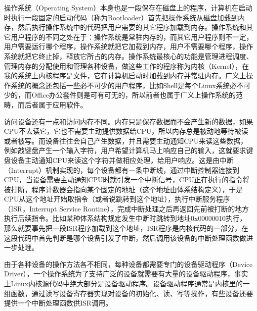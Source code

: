 操作系统（Operating System）本身也是一段保存在磁盘上的程序，计算机在启动时执行一段固定的启动代码（称为Bootloader）首先把操作系统从磁盘加载到内存，然后执行操作系统中的代码把用户需要的其它程序加载到内存。操作系统和其它用户程序的不同之处在于：操作系统是常驻内存的，而其它用户程序则不一定，用户需要运行哪个程序，操作系统就把它加载到内存，用户不需要哪个程序，操作系统就把它终止掉，释放它所占的内存。操作系统最核心的功能是管理进程调度、管理内存的分配使用和管理各种设备，做这些工作的程序称为内核（Kernel），在我的系统上内核程序是文件，它在计算机启动时加载到内存并常驻内存。广义上操作系统的概念还包括一些必不可少的用户程序，比如Shell是每个Linux系统必不可少的，而Office办公套件则是可有可无的，所以前者也属于广义上操作系统的范畴，而后者属于应用软件。



访问设备还有一点和访问内存不同。内存只是保存数据而不会产生新的数据，如果CPU不去读它，它也不需要主动提供数据给CPU，所以内存总是被动地等待被读或者被写。而设备往往会自己产生数据，并且需要主动通知CPU来读这些数据，例如敲键盘产生一个输入字符，用户希望计算机马上响应自己的输入，这就要求键盘设备主动通知CPU来读这个字符并做相应处理，给用户响应。这是由中断（Interrupt）机制实现的，每个设备都有一条中断线，通过中断控制器连接到CPU，当设备需要主动通知CPU时就引发一个中断信号，CPU正在执行的指令将被打断，程序计数器会指向某个固定的地址（这个地址由体系结构定义），于是CPU从这个地址开始取指令（或者说跳转到这个地址），执行中断服务程序（ISR，Interrupt Service Routine），完成中断处理之后再返回先前被打断的地方执行后续指令。比如某种体系结构规定发生中断时跳转到地址0x00000010执行，那么就要事先把一段ISR程序加载到这个地址，ISR程序是内核代码的一部分，在这段代码中首先判断是哪个设备引发了中断，然后调用该设备的中断处理函数做进一步处理。



由于各种设备的操作方法各不相同，每种设备都需要专门的设备驱动程序（Device Driver），一个操作系统为了支持广泛的设备就需要有大量的设备驱动程序，事实上Linux内核源代码中绝大部分是设备驱动程序。设备驱动程序通常是内核里的一组函数，通过读写设备寄存器实现对设备的初始化、读、写等操作，有些设备还要提供一个中断处理函数供ISR调用。



